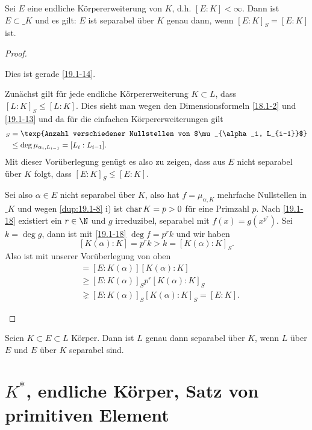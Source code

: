 \begin{st} \label{19.1-19}
	Sei $E$ eine endliche Körpererweiterung von $K$, d.h. $[E : K] < \infty$.
	Dann ist $E \subset \_K$ und es gilt:
	$E$ ist separabel über $K$ genau dann, wenn $[E : K]_S = [E : K]$ ist.
	\begin{proof}
		\begin{segnb}{\ProofImplication}
			Dies ist gerade \ref{19.1-14}.
		\end{segnb}
		\begin{segnb}{\ProofImplication}
			Zunächst gilt für jede endliche Körpererweiterung $K \subset L$, dass $[L:K]_S \le [L:K]$.
			Dies sieht man wegen den Dimensionsformeln \ref{18.1-2} und \ref{19.1-13} und da für die einfachen Körpererweiterungen gilt
			\begin{align*}
				[L_i : L_{i-1}]_S
				&= \texp{Anzahl verschiedener Nullstellen von $\mu_{\alpha_i, L_{i-1}}$} \\
				&\le \deg \mu_{\alpha_i, L_{i-1}}
				= [L_i : L_{i-1}].
			\end{align*}
			Mit dieser Vorüberlegung genügt es also zu zeigen, dass aus $E$ nicht separabel über $K$ folgt, dass $[E:K]_S \lneq [E:K]$.

			Sei also $\alpha \in E$ nicht separabel über $K$, also hat $f = \mu_{\alpha, K}$ mehrfache Nullstellen in $\_K$ und wegen \ref{dup:19.1-8} i) ist $\operatorname{char} K = p > 0$ für eine Primzahl $p$.
			Nach \ref{19.1-18} existiert ein $r \in \N$ und $g$ irreduzibel, separabel mit $f(x) = g(x^{p^r})$.
			Sei $k = \deg g$, dann ist mit \ref{19.1-18} $\deg f = p^r k$ und wir haben
			\[
				[K(\alpha):K] = p^r k > k = [K(\alpha):K]_S.
			\]
			Also ist mit unserer Vorüberlegung von oben
			\begin{align*}
				[E:K] &= [E:K(\alpha)][K(\alpha):K] \\
				&\ge [E:K(\alpha)]_S p^r [K(\alpha):K]_S \\
				&\gneq [E:K(\alpha)]_S [K(\alpha):K]_S
				= [E:K].
			\end{align*}
		\end{segnb}
	\end{proof}
\end{st}

\begin{st} \label{19.1-20}
	Seien $K \subset E \subset L$ Körper.
	Dann ist $L$ genau dann separabel über $K$, wenn $L$ über $E$ und $E$ über $K$ separabel sind.
\end{st}


\section{\texorpdfstring{$K^*$}{K*}, endliche Körper, Satz von primitiven Element}

